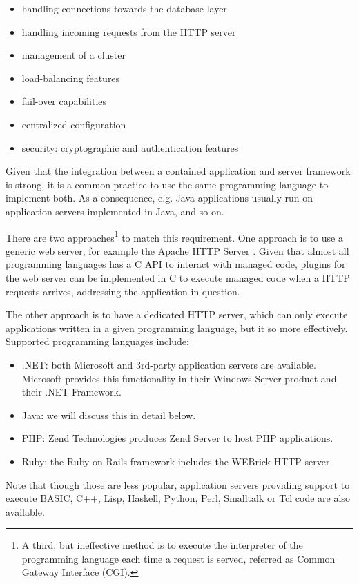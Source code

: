\begin{itemize}
\item handling connections towards the database layer
\item handling incoming requests from the HTTP server
\item management of a cluster
\item load-balancing features
\item fail-over capabilities
\item centralized configuration
\item security: cryptographic and authentication features
\end{itemize}

Given that the integration between a contained application and server framework
is strong, it is a common practice to use the same programming language to
implement both. As a consequence, e.g. Java applications usually run on
application servers implemented in Java, and so on.

There are two approaches\footnote{A third, but ineffective method is to
execute the interpreter of the programming language each time a request is
served, referred as Common Gateway Interface (CGI).} to match this requirement.
One approach is to use a generic web server, for example the Apache HTTP
Server \cite{apache-httpd}. Given that almost all programming languages has a C
API to interact with managed code, plugins for the web server can be
implemented in C to execute managed code when a HTTP requests arrives,
addressing the application in question.

The other approach is to have a dedicated HTTP server, which can only execute
applications written in a given programming language, but it so more
effectively. Supported programming languages include:

\begin{itemize}
\item .NET: both Microsoft and 3rd-party application servers are available.
Microsoft provides this functionality in their Windows Server product and their
.NET Framework.
\item Java: we will discuss this in detail below.
\item PHP: Zend Technologies produces Zend Server to host PHP applications.
\item Ruby: the Ruby on Rails framework includes the WEBrick HTTP server.
\end{itemize}

Note that though those are less popular, application servers providing support
to execute BASIC, C++, Lisp, Haskell, Python, Perl, Smalltalk or Tcl code are
also available.


